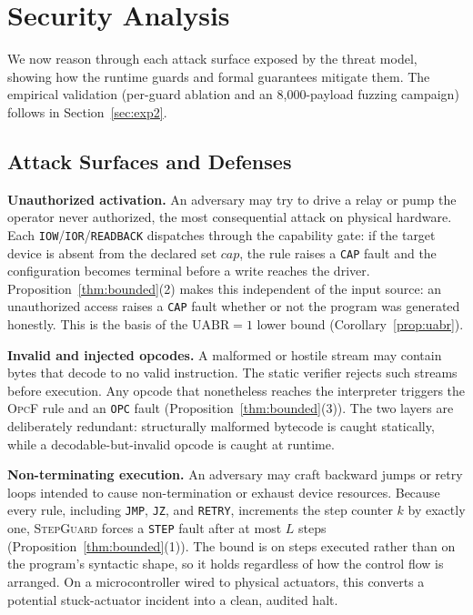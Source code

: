 \documentclass[a4paper,fleqn,longmktitle]{cas-dc}
\begin{document}
\section{Security Analysis}
\label{sec:security}

We now reason through each attack surface exposed by the threat model, showing how the runtime guards and formal guarantees mitigate them. The empirical validation (per-guard ablation and an 8{,}000-payload fuzzing campaign) follows in Section~\ref{sec:exp2}.

\subsection{Attack Surfaces and Defenses}
\label{sec:attack_surfaces}

\noindent\textbf{Unauthorized activation.} An adversary may try to drive a relay or pump the operator never authorized, the most consequential attack on physical hardware. Each \texttt{IOW}/\texttt{IOR}/\texttt{READBACK} dispatches through the capability gate: if the target device is absent from the declared set $\mathit{cap}$, the rule raises a \texttt{CAP} fault and the configuration becomes terminal before a write reaches the driver. Proposition~\ref{thm:bounded}(2) makes this independent of the input source: an unauthorized access raises a \texttt{CAP} fault whether or not the program was generated honestly. This is the basis of the $\text{UABR}=1$ lower bound (Corollary~\ref{prop:uabr}).

\noindent\textbf{Invalid and injected opcodes.} A malformed or hostile stream may contain bytes that decode to no valid instruction. The static verifier rejects such streams before execution. Any opcode that nonetheless reaches the interpreter triggers the \textsc{OpcF} rule and an \texttt{OPC} fault (Proposition~\ref{thm:bounded}(3)). The two layers are deliberately redundant: structurally malformed bytecode is caught statically, while a decodable-but-invalid opcode is caught at runtime.

\noindent\textbf{Non-terminating execution.} An adversary may craft backward jumps or retry loops intended to cause non-termination or exhaust device resources. Because every rule, including \texttt{JMP}, \texttt{JZ}, and \texttt{RETRY}, increments the step counter $k$ by exactly one, \textsc{StepGuard} forces a \texttt{STEP} fault after at most $L$ steps (Proposition~\ref{thm:bounded}(1)). The bound is on steps executed rather than on the program's syntactic shape, so it holds regardless of how the control flow is arranged. On a microcontroller wired to physical actuators, this converts a potential stuck-actuator incident into a clean, audited halt.
\end{document}
